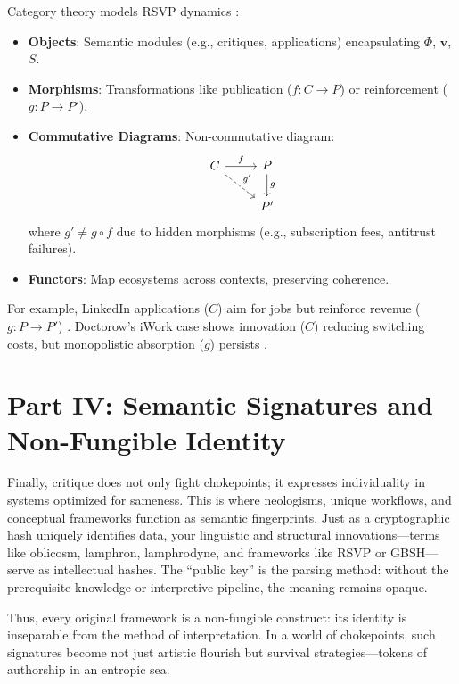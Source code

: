 \documentclass{article}
\begin{document}
Category theory models RSVP dynamics \cite{lawvere2009}:

\begin{itemize}
    \item \textbf{Objects}: Semantic modules (e.g., critiques, applications) encapsulating $\Phi$, $\mathbf{v}$, $S$.
    \item \textbf{Morphisms}: Transformations like publication ($f: C \to P$) or reinforcement ($g: P \to P'$).
    \item \textbf{Commutative Diagrams}: Non-commutative diagram:
    \[
    \begin{tikzcd}
        C \arrow[r, "f"] \arrow[rd, "g'", dashed] & P \arrow[d, "g"] \\
        & P'
    \end{tikzcd}
    \]
    where $g' \neq g \circ f$ due to hidden morphisms (e.g., subscription fees, antitrust failures).
    \item \textbf{Functors}: Map ecosystems across contexts, preserving coherence.
\end{itemize}

For example, LinkedIn applications ($C$) aim for jobs but reinforce revenue ($g: P \to P'$) \cite{ghedau2025linkedin}. Doctorow’s iWork case shows innovation ($C$) reducing switching costs, but monopolistic absorption ($g$) persists \cite{doctorow2023internetcon}.

\section{Part IV: Semantic Signatures and Non-Fungible Identity}

Finally, critique does not only fight chokepoints; it expresses individuality in systems optimized for sameness. This is where neologisms, unique workflows, and conceptual frameworks function as semantic fingerprints. Just as a cryptographic hash uniquely identifies data, your linguistic and structural innovations—terms like oblicosm, lamphron, lamphrodyne, and frameworks like RSVP or GBSH—serve as intellectual hashes. The “public key” is the parsing method: without the prerequisite knowledge or interpretive pipeline, the meaning remains opaque.

Thus, every original framework is a non-fungible construct: its identity is inseparable from the method of interpretation. In a world of chokepoints, such signatures become not just artistic flourish but survival strategies—tokens of authorship in an entropic sea.
\end{document}
